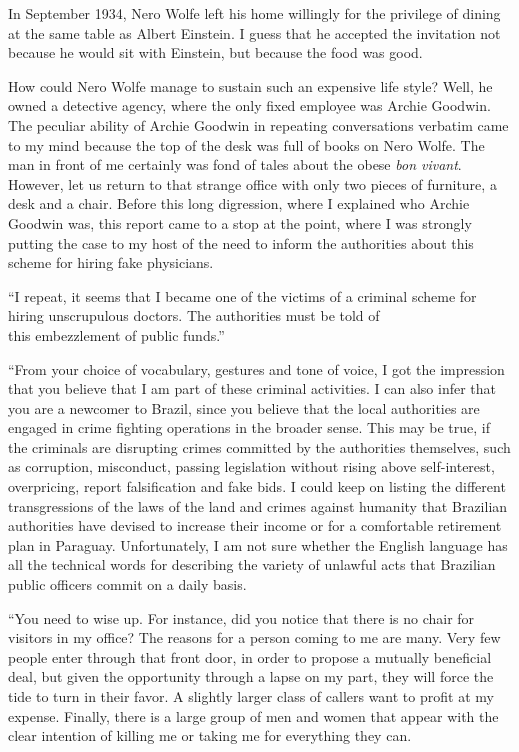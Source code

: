 \documentclass[
  12pt,
]{book}
\begin{document}
In September 1934, Nero Wolfe left his home willingly for the privilege
of dining at the same table as Albert Einstein. I guess that he accepted
the invitation not because he would sit with Einstein, but because the
food was good.

How could Nero Wolfe manage to sustain such an expensive life style?
Well, he owned a detective agency, where the only fixed employee was
Archie Goodwin. The peculiar ability of Archie Goodwin in repeating
conversations verbatim came to my mind because the top of the desk was
full of books on Nero Wolfe. The man in front of me certainly was fond
of tales about the obese \emph{bon vivant}. However, let us return to
that strange office with only two pieces of furniture, a desk and a
chair. Before this long digression, where I explained who Archie Goodwin
was, this report came to a stop at the point, where I was strongly
putting the case to my host of the need to inform the authorities about
this scheme for hiring fake physicians.

``I repeat, it seems that I became one of the victims of a criminal
scheme for hiring unscrupulous doctors. The authorities must be told
of\\
this embezzlement of public funds.''

``From your choice of vocabulary, gestures and tone of voice, I got the
impression that you believe that I am part of these criminal activities.
I can also infer that you are a newcomer to Brazil, since you believe
that the local authorities are engaged in crime fighting operations in
the broader sense. This may be true, if the criminals are disrupting
crimes committed by the authorities themselves, such as corruption,
misconduct, passing legislation without rising above self-interest,
overpricing, report falsification and fake bids. I could keep on listing
the different transgressions of the laws of the land and crimes against
humanity that Brazilian authorities have devised to increase their
income or for a comfortable retirement plan in Paraguay. Unfortunately,
I am not sure whether the English language has all the technical words
for describing the variety of unlawful acts that Brazilian public
officers commit on a daily basis.

``You need to wise up. For instance, did you notice that there is no
chair for visitors in my office? The reasons for a person coming to me
are many. Very few people enter through that front door, in order to
propose a mutually beneficial deal, but given the opportunity through a
lapse on my part, they will force the tide to turn in their favor. A
slightly larger class of callers want to profit at my expense. Finally,
there is a large group of men and women that appear with the clear
intention of killing me or taking me for everything they can.
\end{document}
